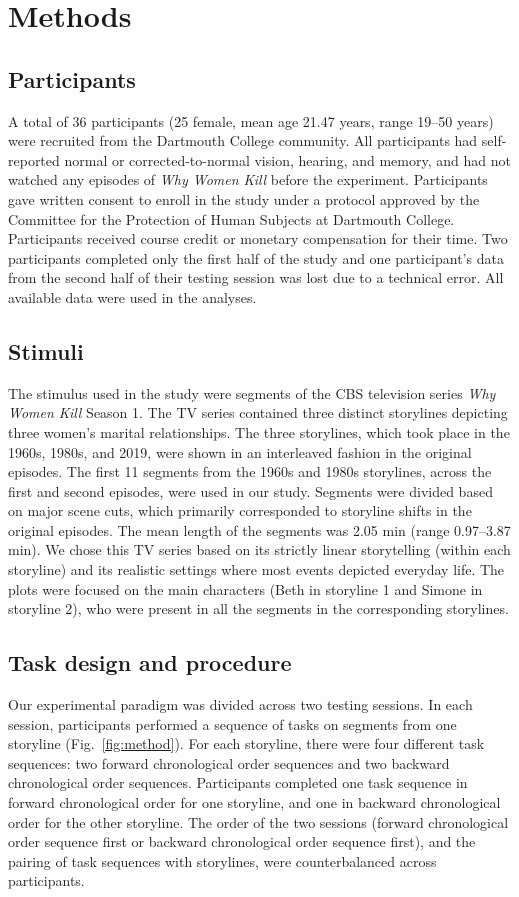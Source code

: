 \documentclass[10pt]{article}
\begin{document}
\section*{Methods}
\subsection*{Participants}
A total of 36 participants (25 female, mean age 21.47 years, range 19--50 years) were recruited from the Dartmouth College community. All participants had self-reported normal or corrected-to-normal vision, hearing, and memory, and had not watched any episodes of \textit{Why Women Kill} before the experiment. Participants gave written consent to enroll in the study under a protocol approved by the Committee for the Protection of Human Subjects at Dartmouth College.  Participants received course credit or monetary compensation for their time. Two participants completed only the first half of the study and one participant’s data from the second half of their testing session was lost due to a technical error. All available data were used in the analyses.

\subsection*{Stimuli}
The stimulus used in the study were segments of the CBS television series \textit{Why Women Kill} Season 1. The TV series contained three distinct storylines depicting three women’s marital relationships. The three storylines, which took place in the 1960s, 1980s, and 2019, were shown in an interleaved fashion in the original episodes. The first 11 segments from the 1960s and 1980s storylines, across the first and second episodes, were used in our study. Segments were divided based on major scene cuts, which primarily corresponded to storyline shifts in the original episodes. The mean length of the segments was 2.05 min (range 0.97--3.87 min). We chose this TV series based on its strictly linear storytelling (within each storyline) and its realistic settings where most events depicted everyday life. The plots were focused on the main characters (Beth in storyline 1 and Simone in storyline 2), who were present in all the segments in the corresponding storylines.

\subsection*{Task design and procedure}
Our experimental paradigm was divided across two testing sessions. In each session, participants performed a sequence of tasks on segments from one storyline (Fig.~\ref{fig:method}).  For each storyline, there were four different task sequences: two forward chronological order sequences and two backward chronological order sequences. Participants completed one task sequence in forward chronological order for one storyline, and one in backward chronological order for the other storyline. The order of the two sessions (forward chronological order sequence first or backward chronological order sequence first), and the pairing of task sequences with storylines, were counterbalanced across participants.
\end{document}
